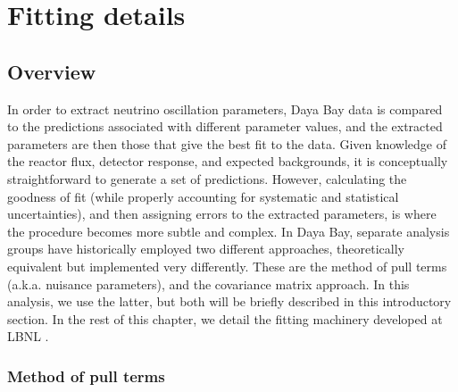 \documentclass[../thesis.tex]{subfiles}
\begin{document}
\chapter{Fitting details}
\label{chap:fittingDetails}

\section{Overview}
\label{sec:fitoverview}


In order to extract neutrino oscillation parameters, Daya Bay data is compared to the predictions associated with different parameter values, and the extracted parameters are then those that give the best fit to the data. Given knowledge of the reactor \nuebar flux, detector response, and expected backgrounds, it is conceptually straightforward to generate a set of predictions. However, calculating the goodness of fit (while properly accounting for systematic and statistical uncertainties), and then assigning errors to the extracted parameters, is where the procedure becomes more subtle and complex. In Daya Bay, separate analysis groups have historically employed two different approaches, theoretically equivalent but implemented very differently. These are the method of pull terms (a.k.a. nuisance parameters), and the covariance matrix approach. In this analysis, we use the latter, but both will be briefly described in this introductory section. In the rest of this chapter, we detail the fitting machinery developed at LBNL \cite{berkeley_shapefit,berkeley_toymc}.

\subsection{Method of pull terms}
\label{sec:pullterms}
\end{document}
